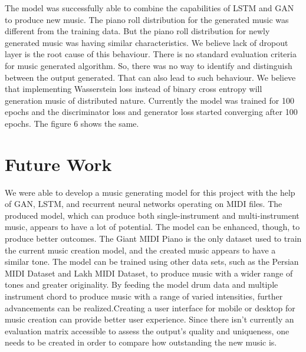\documentclass[letterpaper]{article}
\begin{document}
The model was successfully able to combine the capabilities of LSTM and GAN to produce new music. The piano roll distribution for the generated music was different from the training data. But the piano roll distribution for newly generated music was having similar characteristics. We believe lack of dropout layer is the root cause of this behaviour. There is no standard evaluation criteria for music generated algorithm. So, there was no way to identify and distinguish between the output generated. That can also lead to such behaviour. We believe that implementing Wasserstein loss instead of binary cross entropy will generation music of distributed nature. Currently the model was trained for 100 epochs and the discriminator loss and generator loss started converging after 100 epochs. The figure 6 shows the same.

\section{Future Work}

We were able to develop a music generating model for this project with the help of GAN, LSTM, and recurrent neural networks operating on MIDI files. The produced model, which can produce both single-instrument and multi-instrument music, appears to have a lot of potential. The model can be enhanced, though, to produce better outcomes. The Giant MIDI Piano is the only dataset used to train the current music creation model, and the created music appears to have a similar tone. The model can be trained using other data sets, such as the Persian MIDI Dataset and Lakh MIDI Dataset, to produce music with a wider range of tones and greater originality. By feeding the model drum data  and multiple instrument chord to produce music with a range of varied intensities, further advancements can be realized.Creating a user interface for mobile or desktop for music creation can  provide better user experience. Since there isn't currently an evaluation matrix accessible to assess the output's quality and uniqueness, one needs to be created in order to compare how outstanding the new music is.
\end{document}

